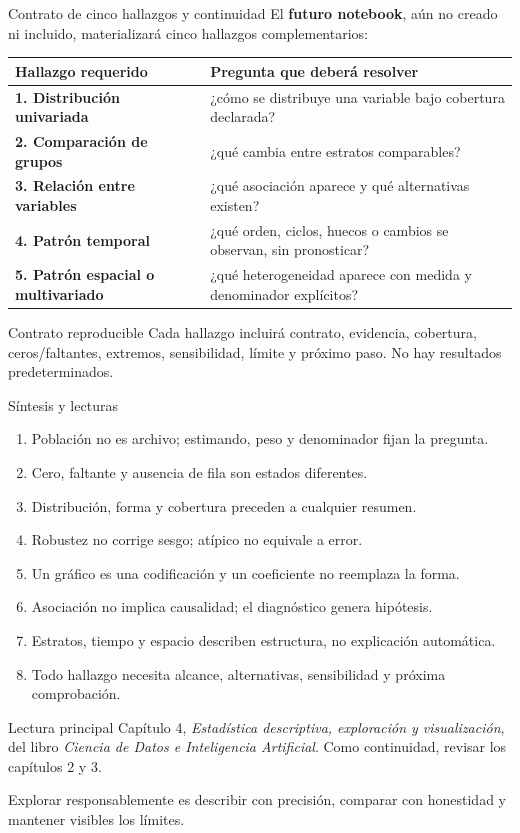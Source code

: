 \documentclass[aspectratio=169,11pt]{beamer}
\begin{document}
\begin{frame}{Contrato de cinco hallazgos y continuidad}
  \footnotesize
  El \textbf{futuro notebook}, aún no creado ni incluido, materializará cinco hallazgos complementarios:
  \begin{tabularx}{\textwidth}{>{\bfseries}p{} X}
    \toprule
    Hallazgo requerido & Pregunta que deberá resolver \\
    \midrule
    1. Distribución univariada & ¿cómo se distribuye una variable bajo cobertura declarada? \\
    2. Comparación de grupos & ¿qué cambia entre estratos comparables? \\
    3. Relación entre variables & ¿qué asociación aparece y qué alternativas existen? \\
    4. Patrón temporal & ¿qué orden, ciclos, huecos o cambios se observan, sin pronosticar? \\
    5. Patrón espacial o multivariado & ¿qué heterogeneidad aparece con medida y denominador explícitos? \\
    \bottomrule
  \end{tabularx}
  \vspace{.5em}
  \begin{block}{Contrato reproducible}
    Cada hallazgo incluirá contrato, evidencia, cobertura, ceros/faltantes, extremos, sensibilidad, límite y próximo paso. No hay resultados predeterminados.
  \end{block}
\end{frame}

\begin{frame}{Síntesis y lecturas}
  \footnotesize
  \begin{enumerate}
    \item Población no es archivo; estimando, peso y denominador fijan la pregunta.
    \item Cero, faltante y ausencia de fila son estados diferentes.
    \item Distribución, forma y cobertura preceden a cualquier resumen.
    \item Robustez no corrige sesgo; atípico no equivale a error.
    \item Un gráfico es una codificación y un coeficiente no reemplaza la forma.
    \item Asociación no implica causalidad; el diagnóstico genera hipótesis.
    \item Estratos, tiempo y espacio describen estructura, no explicación automática.
    \item Todo hallazgo necesita alcance, alternativas, sensibilidad y próxima comprobación.
  \end{enumerate}
  \begin{block}{Lectura principal}
    Capítulo 4, \textit{Estadística descriptiva, exploración y visualización}, del libro \textit{Ciencia de Datos e Inteligencia Artificial}. Como continuidad, revisar los capítulos 2 y 3.
  \end{block}
  \centering\alert{Explorar responsablemente es describir con precisión, comparar con honestidad y mantener visibles los límites.}
\end{frame}
\end{document}
